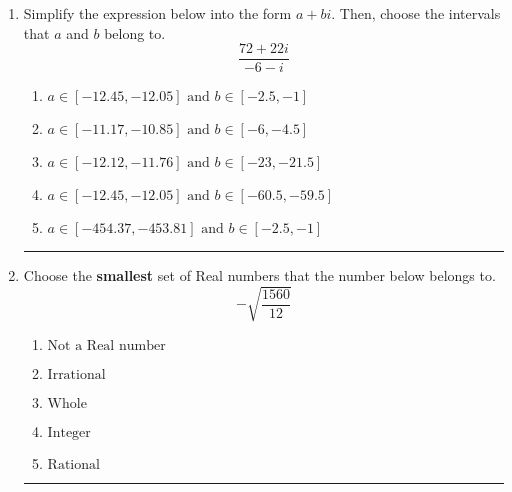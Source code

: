 \documentclass[14pt]{extbook}
\newcommand{\litem}[1]{\item#1\hspace*{-1cm}\rule{\textwidth}{0.4pt}}
\begin{document}
\begin{enumerate}
{\begin{enumerate}[label=\Alph*.]
\end{enumerate} }
\litem{
Simplify the expression below into the form $a+bi$. Then, choose the intervals that $a$ and $b$ belong to.\[ \frac{72 + 22 i}{-6 - i} \]\begin{enumerate}[label=\Alph*.]
\item \( a \in [-12.45, -12.05] \text{ and } b \in [-2.5, -1] \)
\item \( a \in [-11.17, -10.85] \text{ and } b \in [-6, -4.5] \)
\item \( a \in [-12.12, -11.76] \text{ and } b \in [-23, -21.5] \)
\item \( a \in [-12.45, -12.05] \text{ and } b \in [-60.5, -59.5] \)
\item \( a \in [-454.37, -453.81] \text{ and } b \in [-2.5, -1] \)

\end{enumerate} }
\litem{
Choose the \textbf{smallest} set of Real numbers that the number below belongs to.\[ -\sqrt{\frac{1560}{12}} \]\begin{enumerate}[label=\Alph*.]
\item \( \text{Not a Real number} \)
\item \( \text{Irrational} \)
\item \( \text{Whole} \)
\item \( \text{Integer} \)
\item \( \text{Rational} \)

\end{enumerate} }
\end{enumerate}
\end{document}

